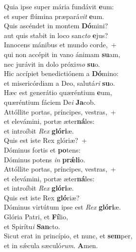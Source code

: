 \evenverse Quia ipse super mária fundávit \textbf{e}um:~\*\\
\evenverse et super flúmina præpará\textit{vit} \textbf{e}um.\\
\oddverse Quis ascéndet in montem \textbf{Dó}mini?~\*\\
\oddverse aut quis stabit in loco san\textit{cto} \textbf{e}jus?\\
\evenverse Innocens mánibus et mundo corde,~+\\
\evenverse  qui non accépit in vano ánimam \textbf{su}am,~\*\\
\evenverse nec jurávit in dolo próxi\textit{mo} \textbf{su}o.\\
\oddverse Hic accípiet benedictiónem a \textbf{Dó}mino:~\*\\
\oddverse et misericórdiam a Deo, salutá\textit{ri} \textbf{su}o.\\
\evenverse Hæc est generátio quæréntium \textbf{e}um,~\*\\
\evenverse quæréntium fáciem De\textit{i} \textbf{Ja}cob.\\
\oddverse Attóllite portas, príncipes, vestras,~+\\
\oddverse  et elevámini, portæ æter\textbf{ná}les:~\*\\
\oddverse et introíbit \textit{Rex} \textbf{gló}\textbf{ri}æ.\\
\evenverse Quis est iste Rex glóriæ?~+\\
\evenverse  Dóminus fortis et \textbf{po}tens:~\*\\
\evenverse Dóminus potens \textit{in} \textbf{prǽ}\textbf{li}o.\\
\oddverse Attóllite portas, príncipes, vestras,~+\\
\oddverse  et elevámini, portæ æter\textbf{ná}les:~\*\\
\oddverse et introíbit \textit{Rex} \textbf{gló}\textbf{ri}æ.\\
\evenverse Quis est iste Rex \textbf{gló}riæ?~\*\\
\evenverse Dóminus virtútum ipse est \textit{Rex} \textbf{gló}\textbf{ri}æ.\\
\oddverse Glória Patri, et \textbf{Fí}lio,~\*\\
\oddverse et Spirítu\textit{i} \textbf{San}cto.\\
\evenverse Sicut erat in princípio, et nunc, et \textbf{sem}per,~\*\\
\evenverse et in sǽcula sæculó\textit{rum}. \textbf{A}men.\\
